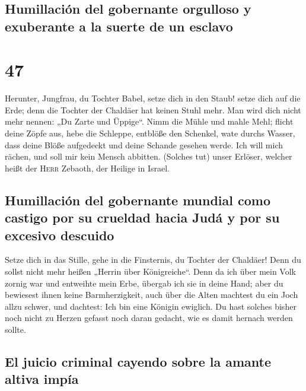 \hypertarget{humillaciuxf3n-del-gobernante-orgulloso-y-exuberante-a-la-suerte-de-un-esclavo}{%
\subsection{Humillación del gobernante orgulloso y exuberante a la
suerte de un
esclavo}\label{humillaciuxf3n-del-gobernante-orgulloso-y-exuberante-a-la-suerte-de-un-esclavo}}

\hypertarget{section-46}{%
\section{47}\label{section-46}}

 Herunter, Jungfrau, du Tochter Babel, setze dich in den
Staub! setze dich auf die Erde; denn die Tochter der Chaldäer hat keinen
Stuhl mehr. Man wird dich nicht mehr nennen: „Du Zarte und Üppige``.
 Nimm die Mühle und mahle Mehl; flicht deine Zöpfe aus,
hebe die Schleppe, entblöße den Schenkel, wate durchs Wasser,
 dass deine Blöße aufgedeckt und deine Schande gesehen
werde. Ich will mich rächen, und soll mir kein Mensch abbitten.
 (Solches tut) unser Erlöser, welcher heißt der
\textsc{Herr} Zebaoth, der Heilige in Israel.

\hypertarget{humillaciuxf3n-del-gobernante-mundial-como-castigo-por-su-crueldad-hacia-juduxe1-y-por-su-excesivo-descuido}{%
\subsection{Humillación del gobernante mundial como castigo por su
crueldad hacia Judá y por su excesivo
descuido}\label{humillaciuxf3n-del-gobernante-mundial-como-castigo-por-su-crueldad-hacia-juduxe1-y-por-su-excesivo-descuido}}

 Setze dich in das Stille, gehe in die Finsternis, du
Tochter der Chaldäer! Denn du sollst nicht mehr heißen „Herrin über
Königreiche``.  Denn da ich über mein Volk zornig war und
entweihte mein Erbe, übergab ich sie in deine Hand; aber du bewiesest
ihnen keine Barmherzigkeit, auch über die Alten machtest du ein Joch
allzu schwer,  und dachtest: Ich bin eine Königin
ewiglich. Du hast solches bisher noch nicht zu Herzen gefasst noch daran
gedacht, wie es damit hernach werden sollte.

\hypertarget{el-juicio-criminal-cayendo-sobre-la-amante-altiva-impuxeda}{%
\subsection{El juicio criminal cayendo sobre la amante altiva
impía}\label{el-juicio-criminal-cayendo-sobre-la-amante-altiva-impuxeda}}

